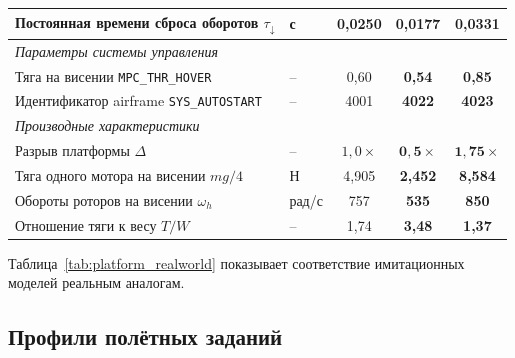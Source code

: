 \begin{table}[htbp]
{\begin{tabular}{llccc}
			Постоянная времени сброса оборотов $\tau_{\downarrow}$ & с & 0{,}0250 & \textbf{0{,}0177} & \textbf{0{,}0331} \\
			\midrule
			\multicolumn{5}{l}{\textit{Параметры системы управления}} \\
			Тяга на висении \texttt{MPC\_THR\_HOVER} & -- & 0{,}60 & \textbf{0{,}54} & \textbf{0{,}85} \\
			Идентификатор airframe \texttt{SYS\_AUTOSTART} & -- & 4001 & \textbf{4022} & \textbf{4023} \\
			\midrule
			\multicolumn{5}{l}{\textit{Производные характеристики}} \\
			Разрыв платформы $\Delta$ & -- & $1{,}0\times$ & $\mathbf{0{,}5\times}$ & $\mathbf{1{,}75\times}$ \\
			Тяга одного мотора на висении $mg/4$ & Н & 4{,}905 & \textbf{2{,}452} & \textbf{8{,}584} \\
			Обороты роторов на висении $\omega_h$ & рад/с & 757 & \textbf{535} & \textbf{850} \\
			Отношение тяги к весу $T/W$ & -- & 1{,}74 & \textbf{3{,}48} & \textbf{1{,}37} \\
			\bottomrule
		\end{tabular}%
	}
\end{table}

Таблица~\ref{tab:platform_realworld} показывает соответствие имитационных моделей реальным аналогам.

\begin{table}[htbp]
	\centering
	\footnotesize
	\caption{Соответствие имитационных моделей реальным платформам.}
	\label{tab:platform_realworld}
	\setlength{\tabcolsep}{3pt}
\end{table}


\subsection{Профили полётных заданий}

